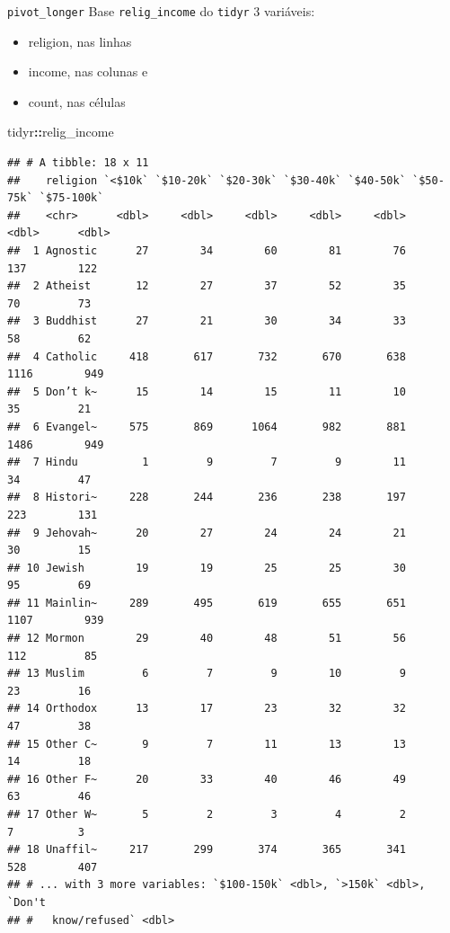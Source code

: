 \documentclass[
  9pt,
  ignorenonframetext,
]{beamer}
\newenvironment{Shaded}{\begin{snugshade}}{\end{snugshade}}
\newcommand{\NormalTok}[1]{#1}
\newcommand{\OperatorTok}[1]{\textcolor[rgb]{0.81,0.36,0.00}{\textbf{#1}}}
\providecommand{\tightlist}{%
  \setlength{\itemsep}{0pt}\setlength{\parskip}{0pt}}
\begin{document}
\begin{frame}[fragile]{\texttt{pivot\_longer}}
\protect\hypertarget{pivot_longer}{}
Base \texttt{relig\_income} do \texttt{tidyr} 3 variáveis:

\begin{itemize}
\tightlist
\item
  religion, nas linhas
\item
  income, nas colunas e
\item
  count, nas células
\end{itemize}

\begin{Shaded}
\begin{Highlighting}[]
\NormalTok{tidyr}\OperatorTok{::}\NormalTok{relig\_income}
\end{Highlighting}
\end{Shaded}

\begin{verbatim}
## # A tibble: 18 x 11
##    religion `<$10k` `$10-20k` `$20-30k` `$30-40k` `$40-50k` `$50-75k` `$75-100k`
##    <chr>      <dbl>     <dbl>     <dbl>     <dbl>     <dbl>     <dbl>      <dbl>
##  1 Agnostic      27        34        60        81        76       137        122
##  2 Atheist       12        27        37        52        35        70         73
##  3 Buddhist      27        21        30        34        33        58         62
##  4 Catholic     418       617       732       670       638      1116        949
##  5 Don’t k~      15        14        15        11        10        35         21
##  6 Evangel~     575       869      1064       982       881      1486        949
##  7 Hindu          1         9         7         9        11        34         47
##  8 Histori~     228       244       236       238       197       223        131
##  9 Jehovah~      20        27        24        24        21        30         15
## 10 Jewish        19        19        25        25        30        95         69
## 11 Mainlin~     289       495       619       655       651      1107        939
## 12 Mormon        29        40        48        51        56       112         85
## 13 Muslim         6         7         9        10         9        23         16
## 14 Orthodox      13        17        23        32        32        47         38
## 15 Other C~       9         7        11        13        13        14         18
## 16 Other F~      20        33        40        46        49        63         46
## 17 Other W~       5         2         3         4         2         7          3
## 18 Unaffil~     217       299       374       365       341       528        407
## # ... with 3 more variables: `$100-150k` <dbl>, `>150k` <dbl>, `Don't
## #   know/refused` <dbl>
\end{verbatim}
\end{frame}
\end{document}
